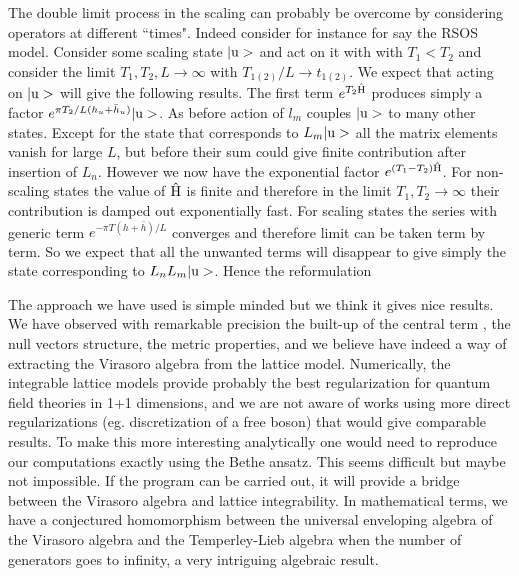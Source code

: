 The double limit process in the scaling  can probably be overcome
by considering operators at different ``times". Indeed consider for instance
%
\eqn{}
%
for say  the RSOS model. Consider some scaling state $|\hbox{u}>$
and act on it with
%
\eqn{}
%
with  $T_1<T_2$ and consider the limit $T_1,T_2,L\rightarrow\infty$ with
$T_{1(2)}/L\rightarrow t_{1(2)}$.
We expect that acting on $|\hbox{u}>$   will  give  the following results. The
first term
$e^{T_2\hat{\rm{H}}}$ produces simply a factor
 $e^{\pi T_2/L(h_u+\bar{h}_u)}|\hbox{u}>$. As
before action of $l_m$ couples $|\hbox{u}>$ to many other states. Except for
the state that corresponds to $L_m|\hbox{u}>$ all the matrix elements
vanish for large $L$, but before their sum could give finite contribution after
insertion of $L_n$.  However
we now have the exponential factor $e^{(T_1-T_2)\hat{\rm{H}}}$.
For non-scaling states  the value of  $\hat{\hbox{H}}$
is finite and therefore in the limit $T_1,T_2\rightarrow\infty$ their
contribution
is damped out exponentially fast. For scaling states
the series with generic term $e^{-\pi T(h+\bar{h})/L}$ converges
and therefore limit can be taken term by term. So we expect that all the
unwanted terms  will disappear to give simply the state corresponding
to $L_nL_m|\hbox{u}>$. Hence the reformulation
%
\eqn{}
%


The approach we have used is simple minded but we think it gives  nice
results. We have  observed with remarkable precision the built-up of the
central term , the null vectors structure,
the metric properties, and we believe have indeed a way of extracting the
Virasoro algebra from the lattice model. Numerically, the integrable
lattice models provide probably the best regularization for quantum field
theories in 1+1 dimensions, and we are not aware of works using more direct
regularizations (eg. discretization of a free boson) that would give comparable
results. To make this more interesting analytically
one would need to reproduce our computations exactly  using the
 Bethe ansatz.
This seems difficult but maybe not impossible. If the program can be carried
out, it will provide a bridge between the Virasoro algebra and lattice
integrability. In mathematical terms, we have a conjectured homomorphism
between the universal enveloping algebra of the Virasoro algebra and the
Temperley-Lieb algebra when the number of generators goes to infinity, a very
intriguing algebraic result.


